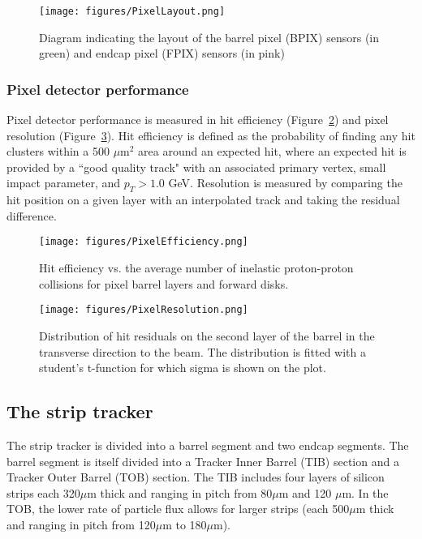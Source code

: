 \begin{figure}\centering
  \texttt{[image: figures/PixelLayout.png]}
  \caption{\label{fig:PixelLayout} Diagram indicating the layout of the barrel pixel (BPIX) sensors (in green) and endcap pixel (FPIX) sensors (in pink)}
\end{figure}

\subsubsection{Pixel detector performance}

Pixel detector performance is measured in hit efficiency (Figure~\ref{fig:PixelEfficiency}) and pixel resolution (Figure~\ref{fig:PixelResolution}). Hit efficiency is defined as the probability of finding any hit clusters within a 500 $\mu$m$^2$ area around an expected hit, where an expected hit is provided by a ``good quality track" with an associated primary vertex, small impact parameter, and $p_{T} > 1.0$ GeV. Resolution is measured by comparing the hit position on a given layer with an interpolated track and taking the residual difference.\cite{PixelPerformance}

\begin{figure}\centering
  \texttt{[image: figures/PixelEfficiency.png]}
  \caption{\label{fig:PixelEfficiency} Hit efficiency vs. the average number of inelastic proton-proton collisions for pixel barrel layers and forward disks.}
\end{figure}

\begin{figure}\centering
  \texttt{[image: figures/PixelResolution.png]}
  \caption{\label{fig:PixelResolution} Distribution of hit residuals on the second layer of the barrel in the transverse direction to the beam. The distribution is fitted with a student's t-function for which sigma is shown on the plot.}
\end{figure}

\subsection{The strip tracker}

The strip tracker is divided into a barrel segment and two endcap segments. The barrel segment is itself divided into a Tracker Inner Barrel (TIB) section and a Tracker Outer Barrel (TOB) section. The TIB includes four layers of silicon strips each 320$\mu$m thick and ranging in pitch from 80$\mu$m and 120 $\mu$m. In the TOB, the lower rate of particle flux allows for larger strips (each 500$\mu$m thick and ranging in pitch from 120$\mu$m to 180$\mu$m).

